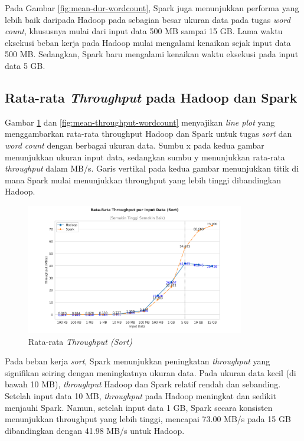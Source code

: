 Pada Gambar \ref{fig:mean-dur-wordcount}, Spark juga menunjukkan performa yang lebih baik daripada Hadoop pada sebagian besar ukuran data pada tugas \textit{word count}, khususnya mulai dari input data 500 MB sampai 15 GB. Lama waktu eksekusi beban kerja pada Hadoop mulai mengalami kenaikan sejak input data 500 MB. Sedangkan, Spark baru mengalami kenaikan waktu eksekusi pada input data 5 GB.



\subsection {Rata-rata \textit{Throughput} pada Hadoop dan Spark}

Gambar \ref{fig:mean-throughput-sort} dan \ref{fig:mean-throughput-wordcount} menyajikan \textit{line plot} yang menggambarkan rata-rata throughput Hadoop dan Spark untuk tugas \textit{sort} dan \textit{word count} dengan berbagai ukuran data. Sumbu x pada kedua gambar menunjukkan ukuran input data, sedangkan sumbu y menunjukkan rata-rata \textit{throughput} dalam MB/s. Garis vertikal pada kedua gambar menunjukkan titik di mana Spark mulai menunjukkan throughput yang lebih tinggi dibandingkan Hadoop.

\begin{figure}[h]
    \centering
    \includegraphics[width=0.85\textwidth]{figures/ch04/2-mean-throughput-sort.png}
    \caption{Rata-rata \textit{Throughput (Sort)}}
    \label{fig:mean-throughput-sort}
\end{figure}

Pada beban kerja \textit{sort}, Spark menunjukkan peningkatan \textit{throughput} yang signifikan seiring dengan meningkatnya ukuran data. Pada ukuran data kecil (di bawah 10 MB), \textit{throughput} Hadoop dan Spark relatif rendah dan sebanding. Setelah input data 10 MB, \textit{throughput} pada Hadoop meningkat dan sedikit menjauhi Spark. Namun, setelah input data 1 GB, Spark secara konsisten menunjukkan throughput yang lebih tinggi, mencapai 73.00 MB/s pada 15 GB dibandingkan dengan 41.98 MB/s untuk Hadoop. 

